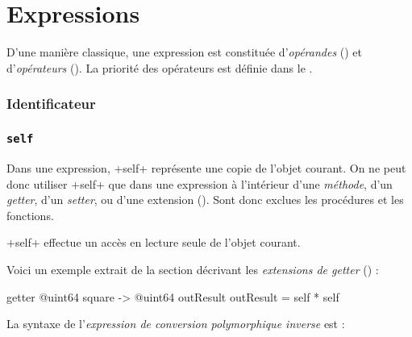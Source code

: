 
\chapter{Expressions}

D'une manière classique, une expression est constituée d'\emph{opérandes} () et d'\emph{opérateurs} (). La priorité des opérateurs est définie dans le .





\subsection{Identificateur}

\subsection{\texttt{self}}

Dans une expression, \ggs+self+ représente une copie de l'objet courant. On ne peut donc utiliser \ggs+self+ que dans une expression à l'intérieur d'une \emph{méthode}, d'un \emph{getter}, d'un \emph{setter}, ou d'une extension (). Sont donc exclues les procédures et les fonctions.

\ggs+self+ effectue un accès en lecture seule de l'objet courant. 

Voici un exemple extrait de la section décrivant les \emph{extensions de getter} () :
\begin{galgas}
getter @uint64 square -> @uint64 outResult {
  outResult = self * self
}
\end{galgas}









La syntaxe de l'\emph{expression de conversion polymorphique inverse} est :

